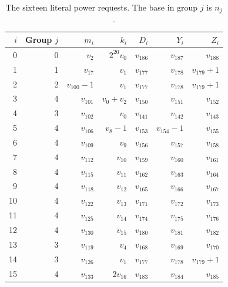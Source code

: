 \begin{table}[htbp]
\centering
\caption{The sixteen literal power requests. The base in group $j$ is $n_j$.}
\label{tab:requests}
\begin{tabular}{rrrrrrr}
\toprule
$i$ & Group $j$ & $m_i$ & $k_i$ & $D_i$ & $Y_i$ & $Z_i$\\
\midrule
0 & 0 & $v_2$ & $2^{20}v_0$ & $v_{186}$ & $v_{187}$ & $v_{188}$\\
1 & 1 & $v_{17}$ & $v_1$ & $v_{177}$ & $v_{178}$ & $v_{179}+1$\\
2 & 2 & $v_{100}-1$ & $v_1$ & $v_{177}$ & $v_{178}$ & $v_{179}+1$\\
3 & 4 & $v_{101}$ & $v_0+v_2$ & $v_{150}$ & $v_{151}$ & $v_{152}$\\
4 & 3 & $v_{102}$ & $v_0$ & $v_{141}$ & $v_{142}$ & $v_{143}$\\
5 & 4 & $v_{106}$ & $v_8-1$ & $v_{153}$ & $v_{154}-1$ & $v_{155}$\\
6 & 4 & $v_{109}$ & $v_9$ & $v_{156}$ & $v_{157}$ & $v_{158}$\\
7 & 4 & $v_{112}$ & $v_{10}$ & $v_{159}$ & $v_{160}$ & $v_{161}$\\
8 & 4 & $v_{115}$ & $v_{11}$ & $v_{162}$ & $v_{163}$ & $v_{164}$\\
9 & 4 & $v_{118}$ & $v_{12}$ & $v_{165}$ & $v_{166}$ & $v_{167}$\\
10 & 4 & $v_{122}$ & $v_{13}$ & $v_{171}$ & $v_{172}$ & $v_{173}$\\
11 & 4 & $v_{125}$ & $v_{14}$ & $v_{174}$ & $v_{175}$ & $v_{176}$\\
12 & 4 & $v_{130}$ & $v_{15}$ & $v_{180}$ & $v_{181}$ & $v_{182}$\\
13 & 3 & $v_{119}$ & $v_4$ & $v_{168}$ & $v_{169}$ & $v_{170}$\\
14 & 3 & $v_{126}$ & $v_1$ & $v_{177}$ & $v_{178}$ & $v_{179}+1$\\
15 & 4 & $v_{133}$ & $2v_{16}$ & $v_{183}$ & $v_{184}$ & $v_{185}$\\
\bottomrule
\end{tabular}
\end{table}
